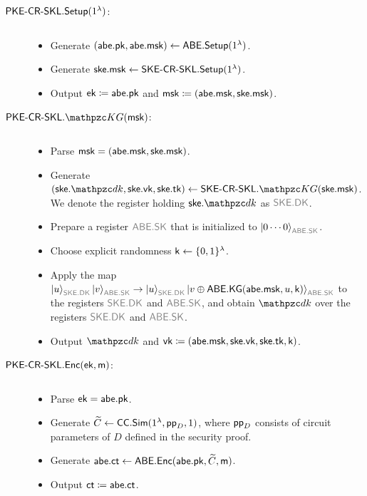 \begin{description}
\item[$\mathsf{PKE}\textrm{-}\mathsf{CR}\textrm{-}\mathsf{SKL}.\mathsf{Setup}(1^\lambda)$:] $ $
\begin{itemize}
    \item Generate $(\mathsf{abe}.\mathsf{pk},\mathsf{abe}.\mathsf{msk})\leftarrow\mathsf{ABE}.\mathsf{Setup}(1^\lambda)$.
    \item Generate $\mathsf{ske}.\mathsf{msk}\leftarrow\mathsf{SKE}\textrm{-}\mathsf{CR}\textrm{-}\mathsf{SKL}.\mathsf{Setup}(1^\lambda)$.
    \item Output $\mathsf{ek}\coloneqq\mathsf{abe}.\mathsf{pk}$ and $\mathsf{msk}\coloneqq(\mathsf{abe}.\mathsf{msk},\mathsf{ske}.\mathsf{msk})$.
\end{itemize}



\item[$\PKECRSKL.\qKG(\msk)$:] $ $
\begin{itemize}
    \item Parse $\mathsf{msk}=(\mathsf{abe}.\mathsf{msk},\mathsf{ske}.\mathsf{msk})$.
    \item Generate $(\ske.\qdk,\ske.\vk,\ske.\tk)\gets\SKECRSKL.\qKG(\ske.\msk)$. We denote the register holding $\ske.\qdk$ as $\qreg{SKE.DK}$.
    \item Prepare a register $\qreg{ABE.SK}$ that is initialized to $\ket{0\cdots0}_{\qreg{ABE.SK}}$.
    \item Choose explicit randomness $\mathsf{k} \leftarrow \{0,1\}^{\lambda}$.
    \item Apply the map
        $\ket{u}_{\qreg{SKE.DK}}\ket{v}_{\qreg{ABE.SK}}\ra\ket{u}_{\qreg{SKE.DK}}\ket{v\oplus\ABE.\KG(\abe.\msk,u,
        \key)}_{\qreg{ABE.SK}}$ to the registers $\qreg{SKE.DK}$ and
        $\qreg{ABE.SK}$, and obtain $\qdk$ over the registers
        $\qreg{SKE.DK}$ and $\qreg{ABE.SK}$.

    \item Output $\qdk$ and
        $\mathsf{vk}\coloneqq(\mathsf{abe}.\mathsf{msk},\mathsf{ske}.\mathsf{vk},\mathsf{ske}.\mathsf{tk}, \mathsf{k})$.
\end{itemize}



\item[$\mathsf{PKE}\textrm{-}\mathsf{CR}\textrm{-}\mathsf{SKL}.\mathsf{Enc}(\mathsf{ek},\mathsf{m})$:] $ $
\begin{itemize}
    \item Parse $\mathsf{ek}=\mathsf{abe}.\mathsf{pk}$.
    \item Generate $\widetilde{C}\leftarrow\mathsf{CC}.\mathsf{Sim}(1^\lambda,\mathsf{pp}_D,1)$, where $\mathsf{pp}_D$ consists of circuit parameters of $D$ defined in the security proof.
    \item Generate $\mathsf{abe}.\mathsf{ct}\leftarrow\mathsf{ABE}.\mathsf{Enc}(\mathsf{abe}.\mathsf{pk},\widetilde{C},\mathsf{m})$.
    \item Output $\mathsf{ct}\coloneqq\mathsf{abe}.\mathsf{ct}$.
\end{itemize}
 

\end{description}

